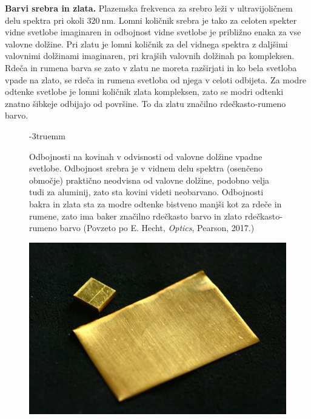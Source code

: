 \begin{example}{\bf Barvi srebra in zlata.}
Plazemska frekvenca za srebro leži v ultravijoličnem delu spektra 
pri okoli $320~\si{\nano\meter}$. Lomni količnik srebra je tako za celoten 
spekter vidne svetlobe imaginaren in odbojnost
vidne svetlobe je približno enaka za vse valovne dolžine.  
Pri zlatu je lomni 
količnik za del vidnega spektra z daljšimi valovnimi dolžinami imaginaren, pri 
krajših valovnih dolžinah pa kompleksen. Rdeča in rumena barva se zato v zlatu 
ne moreta razširjati in ko bela svetloba vpade na zlato, se rdeča in rumena svetloba
od njega v celoti odbijeta. Za modre odtenke
svetlobe je lomni količnik zlata kompleksen, zato se 
modri odtenki znatno šibkeje odbijajo od površine.
To da zlatu značilno rdečkasto-rumeno barvo.
\begin{figure}[htp]
\centering
\def\svgwidth{100truemm} 

\caption{Odbojnosti na kovinah v odvisnosti od valovne dolžine vpadne svetlobe. Odbojnost
srebra je v vidnem delu spektra (osenčeno območje) praktično 
neodvisna od valovne dolžine, podobno velja tudi za aluminij, zato sta kovini
videti neobarvano. Odbojnosti bakra in zlata sta za modre odtenke bistveno 
manjši kot za rdeče in rumene, zato ima baker značilno rdečkasto barvo in zlato
rdečkasto-rumeno barvo (Povzeto po E. Hecht, {\it Optics}, Pearson, 2017.)}
\label{fig:09_kovine}
\vglue-3truemm
\end{figure}
\begin{figure}[htp]
\centering
\includegraphics[width=7truecm]{slike/09_zlato.jpg}\hfill

\end{figure}
\end{example}
